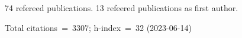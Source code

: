 74 refereed publications. 13 refeered publications as first author.

Total citations~=~3307; h-index~=~32 (2023-06-14)